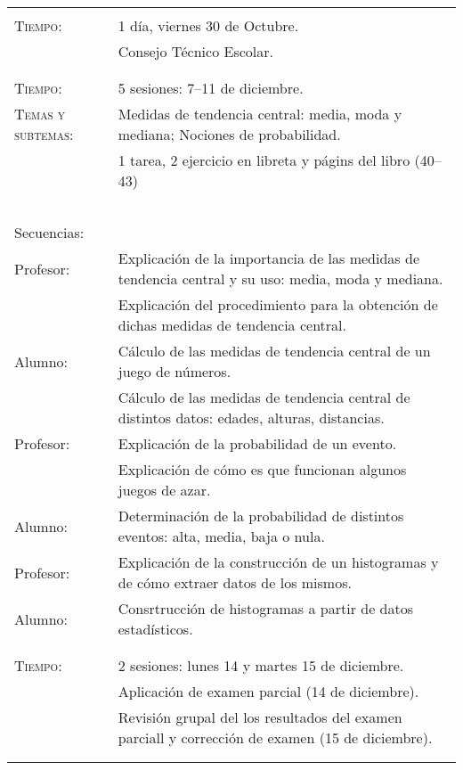 \documentclass[letterpaper,10pt]{article}
\begin{document}
\begin{tabular}[t]{R{0.25\textwidth}p{0.71\textwidth}}
\\ \hline \\
    \textsc{Tiempo:}& 1 d\'ia, viernes 30 de Octubre. \\
                    & {\Large \sc Consejo T\'ecnico Escolar.} \\ 
\\ \hline \\
    \textsc{Tiempo:}                    & 5 sesiones: 7--11 de diciembre. \\
    \textsc{Temas y subtemas:}          & Medidas de tendencia central: media, moda y mediana; Nociones de probabilidad.\\
              & 1 tarea, 2 ejercicio en libreta y p\'agins del libro (40--43) \\ \\
    \large{\sc Secuencias:} \\
    Profesor:   & Explicaci\'on de la importancia de las medidas de tendencia central y su uso: media, moda y mediana. \\
                & Explicaci\'on del procedimiento para la obtenci\'on de dichas medidas de tendencia central. \\
    Alumno:     & C\'alculo de las medidas de tendencia central de un juego de n\'umeros.  \\
                & C\'alculo de las medidas de tendencia central de distintos datos: edades, alturas, distancias. \\
    Profesor:   & Explicaci\'on de la probabilidad de un evento. \\
                & Explicaci\'on de c\'omo es que funcionan algunos juegos de azar. \\
    Alumno:     & Determinación de la probabilidad de distintos eventos: alta, media, baja o nula. \\
    Profesor:   & Explicaci\'on de la construcci\'on de un histogramas y de c\'omo extraer datos de los mismos. \\
    Alumno:     & Consrtrucci\'on de histogramas a partir de datos estad\'isticos.\\
\\ \hline \\
 
    \textsc{Tiempo:}& 2 sesiones: lunes 14 y martes 15  de diciembre. \\
                    & {\Large \sc Aplicaci\'on de examen parcial} (14 de diciembre). \\ 
                    & Revisi\'on grupal del los resultados del examen parciall y correcci\'on de examen (15 de diciembre).\\
\\ \hline \\

\end{tabular}
\end{document}
